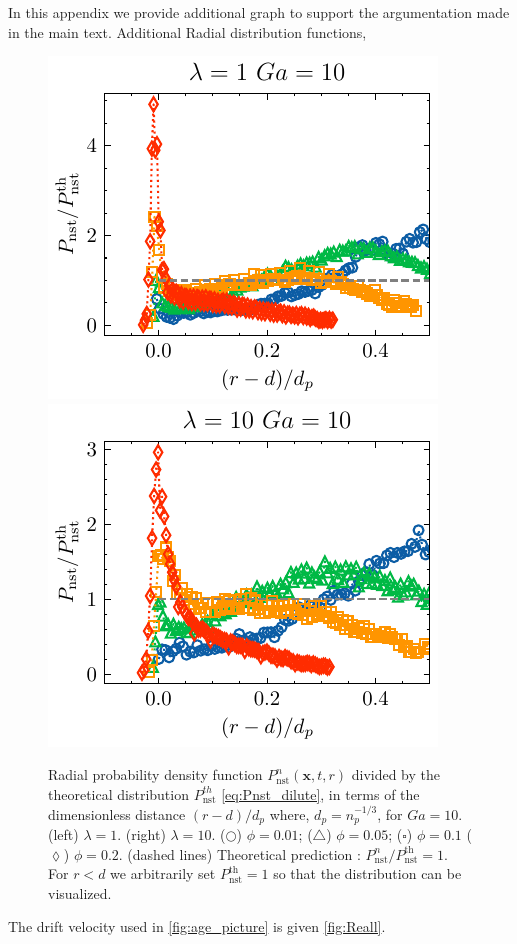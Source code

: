 In this appendix we provide additional graph to support the argumentation made in the main text. 
Additional Radial distribution functions, 
\begin{figure}[h!]
    \centering
    \includegraphics[height=0.3\textwidth]{image/HOMOGENEOUS_NEW/Dist/Pr_l_1_Ga_10.pdf}
    \includegraphics[height=0.3\textwidth]{image/HOMOGENEOUS_NEW/Dist/Pr_l_10_Ga_10.pdf}
    \caption{Radial probability density function $P_\text{nst}^n(\textbf{x},t,r)$ divided by the theoretical distribution $P_\text{nst}^{th}$ \ref{eq:Pnst_dilute}, in terms of the dimensionless distance $(r-d)/d_p$ where, $d_p = n_p^{-1/3}$, for  $Ga = 10$.
    (left)  $\lambda = 1$.
    (right) $\lambda = 10$.
    ($\pmb\bigcirc$) $\phi = 0.01$; ($\pmb\triangle$) $ \phi = 0.05$; ($\pmb\square$) $\phi = 0.1$ ($\pmb\lozenge$) $\phi = 0.2$.
    (dashed lines) Theoretical prediction : $P_\text{nst}^n/P_\text{nst}^\text{th} = 1$. 
    For $r<d$ we arbitrarily set $P_\text{nst}^\text{th} = 1$ so that the distribution can be visualized.
    }
    \label{fig:Pr_low}
\end{figure}
The drift velocity used in \ref{fig:age_picture} is given \ref{fig:Reall}.
